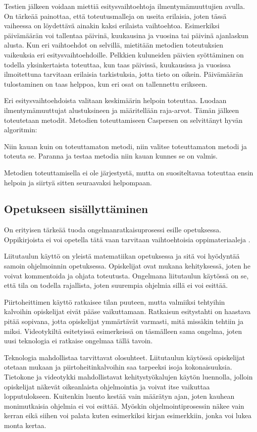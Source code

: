 Testien jälkeen voidaan miettiä esitysvaihtoehtoja ilmentymämuuttujien avulla.
On tärkeää painottaa, että toteutusmalleja on useita erilaisia, joten tässä
vaiheessa on löydettävä ainakin kaksi erilaista vaihtoehtoa. Esimerkiksi
päivämäärän voi tallentaa päivinä, kuukausina ja vuosina tai päivinä ajanlaskun
alusta. Kun eri vaihtoehdot on selvillä, mietitään metodien toteutuksien
vaikeuksia eri esitysvaihtoehdoille. Pelkkien kuluneiden päivien syöttäminen on
todella yksinkertaista toteuttaa, kun taas päivissä, kuukausissa ja vuosissa
ilmoitettuna tarvitaan erilaisia tarkistuksia, jotta tieto on oikein.
Päivämäärän tulostaminen on taas helppoa, kun eri osat on tallennettu erikseen.

Eri esitysvaihtoehdoista valitaan keskimäärin helpoin toteuttaa. Luodaan
ilmentymämuuttujat alustuksineen ja määritellään raja-arvot. Tämän jälkeen
toteutetaan metodit. Metodien toteuttamiseen Caspersen on selvittänyt hyvän
algoritmin:

Niin kauan kuin on toteuttamaton metodi, niin valitse toteuttamaton metodi ja
toteuta se. Paranna ja testaa metodia niin kauan kunnes se on valmis.

Metodien toteuttamisella ei ole järjestystä, mutta on suositeltavaa toteuttaa
ensin helpoin ja siirtyä sitten seuraavaksi helpompaan.

\subsection{Opetukseen sisällyttäminen}

On erityisen tärkeää tuoda ongelmanratkaisuprosessi esille opetuksessa.
Oppikirjoista ei voi opetella tätä vaan tarvitaan vaihtoehtoisia
oppimateriaaleja \cite{Bennedsen:2008}.

Liitutaulun käyttö on yleistä matematiikan opetuksessa ja sitä voi hyödyntää
samoin ohjelmoinnin opetuksessa. Opiskelijat ovat mukana kehityksessä, joten he
voivat kommentoida ja ohjata toteutusta. Ongelmana liitutaulun käytössä on se,
että tila on todella rajallista, joten suurempia ohjelmia sillä ei voi esittää.

Piirtoheittimen käyttö ratkaisee tilan puuteen, mutta valmiiksi tehtyihin
kalvoihin opiskelijat eivät pääse vaikuttamaan. Ratkaisun esitystahti on
haastava pitää sopivana, jotta opiskelijat ymmärtävät varmasti, mitä missäkin
tehtiin ja miksi. Videotykiltä esitetyissä esimerkeissä on täsmälleen sama
ongelma, joten uusi teknologia ei ratkaise ongelmaa tällä tavoin.

Teknologia mahdollistaa tarvittavat olosuhteet. Liitutaulun käytössä opiskelijat
otetaan mukaan ja piirtoheitinkalvoihin saa tarpeeksi isoja kokonaisuuksia.
Tietokone ja videotykki mahdollistavat kehitystyökalujen käytön luennolla,
jolloin opiskelijat näkevät oikeanlaista ohjelmointia ja voivat itse vaikuttaa
lopputulokseen. Kuitenkin luento kestää vain määrätyn ajan, joten kauhean
monimutkaisia ohjelmia ei voi esittää. Myöskin ohjelmointiprosessin näkee vain
kerran eikä siihen voi palata kuten esimerkiksi kirjan esimerkkiin, jonka voi
lukea monta kertaa.


